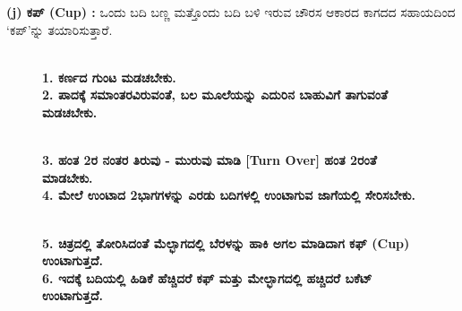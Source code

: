 \noindent
\textbf{(j) ಕಪ್ (Cup) :} ಒಂದು ಬದಿ ಬಣ್ಣ ಮತ್ತೊಂದು ಬದಿ ಬಳಿ ಇರುವ ಚೌರಸ ಆಕಾರದ ಕಾಗದದ ಸಹಾಯದಿಂದ `ಕಪ್'ನ್ನು ತಯಾರಿಸುತ್ತಾರೆ.
\begin{figure}[H]
\\
\textbf{1. ಕರ್ಣದ ಗುಂಟ ಮಡಚಬೇಕು.}\\
\textbf{2. ಪಾದಕ್ಕೆ ಸಮಾಂತರವಿರುವಂತೆ, ಬಲ ಮೂಲೆಯನ್ನು ಎದುರಿನ ಬಾಹುವಿಗೆ ತಾಗುವಂತೆ ಮಡಚಬೇಕು.}
\end{figure}

\vfill\eject

\begin{figure}[H]
\\
\textbf{3. ಹಂತ 2ರ ನಂತರ ತಿರುವು - ಮುರುವು ಮಾಡಿ [Turn Over] ಹಂತ 2ರಂತೆ ಮಾಡಬೇಕು.}\\
\textbf{4. ಮೇಲೆ ಉಂಟಾದ 2ಭಾಗಗಳನ್ನು ಎರಡು ಬದಿಗಳಲ್ಲಿ ಉಂಟಾಗುವ ಜಾಗೆಯಲ್ಲಿ ಸೇರಿಸಬೇಕು.}
\end{figure}
\begin{figure}[H]
\\
\textbf{5. ಚಿತ್ರದಲ್ಲಿ ತೋರಿಸಿದಂತೆ ಮೆಲ್ಭಾಗದಲ್ಲಿ ಬೆರಳನ್ನು ಹಾಕಿ ಅಗಲ ಮಾಡಿದಾಗ ಕಫ್ (Cup) ಉಂಟಾಗುತ್ತದೆ.}\\
\textbf{6. ಇದಕ್ಕೆ ಬದಿಯಲ್ಲಿ ಹಿಡಿಕೆ ಹೆಚ್ಚಿದರೆ ಕಫ್ ಮತ್ತು ಮೇಲ್ಭಾಗದಲ್ಲಿ ಹಚ್ಚಿದರೆ ಬಕೆಟ್ ಉಂಟಾಗುತ್ತದೆ.}
\end{figure}

